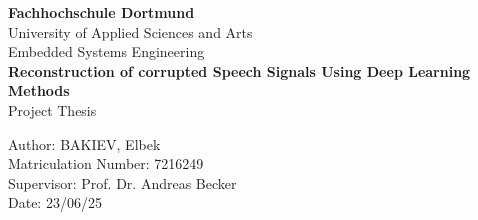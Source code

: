 \begin{titlepage}
    \centering
    {\LARGE \textbf{Fachhochschule Dortmund}\\
    University of Applied Sciences and Arts\\[0.2cm]
    Embedded Systems Engineering}\\[1cm]

    \vfill
    {\Huge \textbf{Reconstruction of corrupted Speech Signals Using Deep Learning Methods}}\\[0.5cm]
    {\Large Project Thesis}\\

    \vfill
    \begin{flushleft}
        Author: \hfill BAKIEV, Elbek\\[0.2cm]
        Matriculation Number: \hfill 7216249\\[1cm]

        Supervisor: \hfill Prof. Dr. Andreas Becker\\[0.2cm]

        Date: \hfill 23/06/25
    \end{flushleft}
\end{titlepage}
